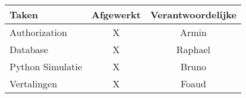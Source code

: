 \begin{tabular}{| l | c | c |}
    \hline
    Taken   &   Afgewerkt   &   Verantwoordelijke \\
    \hline \hline
    Authorization           &   X   &   Armin \\
    Database                &   X   &   Raphael \\
    Python Simulatie        &   X   &   Bruno \\
    Vertalingen             &   X   &   Foaud \\
    \hline
\end{tabular}

